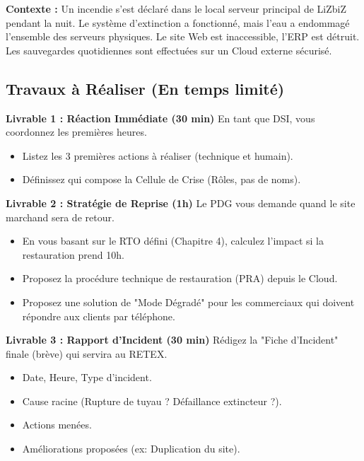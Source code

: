\begin{boxlizbiz}
\textbf{Contexte :}
Un incendie s'est déclaré dans le local serveur principal de LiZbiZ pendant la nuit. Le système d'extinction a fonctionné, mais l'eau a endommagé l'ensemble des serveurs physiques. Le site Web est inaccessible, l'ERP est détruit. Les sauvegardes quotidiennes sont effectuées sur un Cloud externe sécurisé.
\end{boxlizbiz}

\subsection{Travaux à Réaliser (En temps limité)}

\textbf{Livrable 1 : Réaction Immédiate (30 min)}
En tant que DSI, vous coordonnez les premières heures.
\begin{itemize}
    \item Listez les 3 premières actions à réaliser (technique et humain).
    \item Définissez qui compose la Cellule de Crise (Rôles, pas de noms).
\end{itemize}

\textbf{Livrable 2 : Stratégie de Reprise (1h)}
Le PDG vous demande quand le site marchand sera de retour.
\begin{itemize}
    \item En vous basant sur le RTO défini (Chapitre 4), calculez l'impact si la restauration prend 10h.
    \item Proposez la procédure technique de restauration (PRA) depuis le Cloud.
    \item Proposez une solution de "Mode Dégradé" pour les commerciaux qui doivent répondre aux clients par téléphone.
\end{itemize}

\textbf{Livrable 3 : Rapport d'Incident (30 min)}
Rédigez la "Fiche d'Incident" finale (brève) qui servira au RETEX.
\begin{itemize}
    \item Date, Heure, Type d'incident.
    \item Cause racine (Rupture de tuyau ? Défaillance extincteur ?).
    \item Actions menées.
    \item Améliorations proposées (ex: Duplication du site).
\end{itemize}

